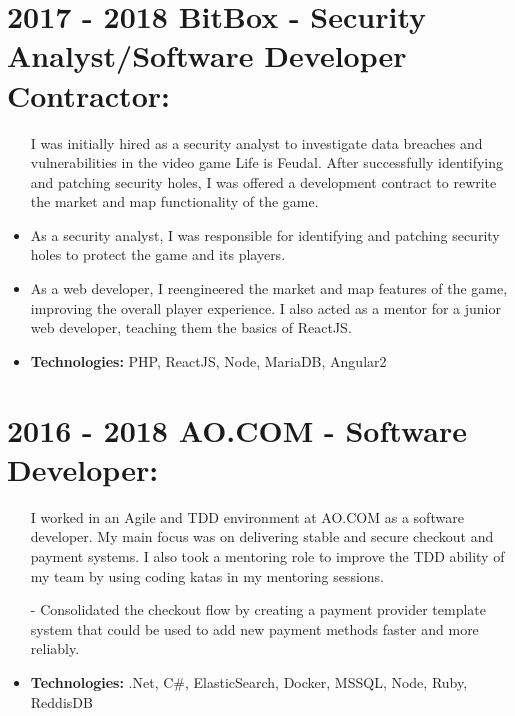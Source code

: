 \documentclass[12pt,a4paper]{res}
\begin{document}
\begin{resume}
\section{\bf 2017 - 2018 \hspace{0.3mm}BitBox - Security Analyst/Software Developer Contractor:}
\vspace{5mm}    
	\begin{itemize}
	\item[]I was initially hired as a security analyst to investigate data breaches and vulnerabilities in the video game Life is Feudal. After successfully identifying and patching security holes, I was offered a development contract to rewrite the market and map functionality of the game.
	\item As a security analyst, I was responsible for identifying and patching security holes to protect the game and its players.
	\item As a web developer, I reengineered the market and map features of the game, improving the overall player experience. I also acted as a mentor for a junior web developer, teaching them the basics of ReactJS.
	\item \textbf{Technologies:} PHP, ReactJS, Node, MariaDB, Angular2
	\end{itemize}
\section{\bf 2016 - 2018 \hspace{0.3mm} AO.COM - Software Developer:}
\begin{itemize}
	\item[] I worked in an Agile and TDD environment at AO.COM as a software developer. My main focus was on delivering stable and secure checkout and payment systems. I also took a mentoring role to improve the TDD ability of my team by using coding katas in my mentoring sessions.
	\item[-] Consolidated the checkout flow by creating a payment provider template system that could be used to add new payment methods faster and more reliably.
	\item \textbf{Technologies:} .Net, C\#, ElasticSearch, Docker, MSSQL, Node, Ruby, ReddisDB
	\end{itemize}

\newpage 


\end{resume}
\end{document}
